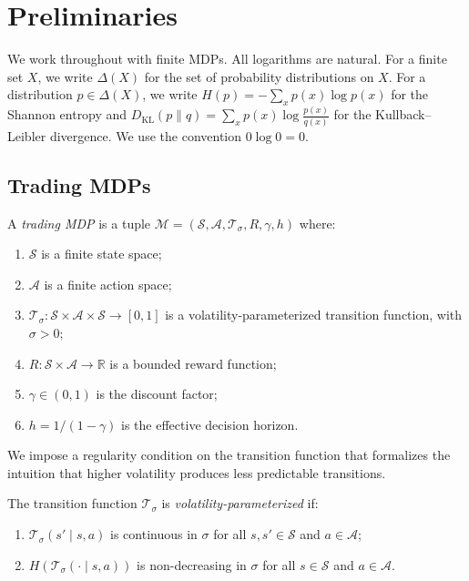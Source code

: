 \section{Preliminaries}\label{sec:prelim}

We work throughout with finite MDPs. All logarithms are natural. For a
finite set $X$, we write $\Delta(X)$ for the set of probability
distributions on $X$. For a distribution $p \in \Delta(X)$, we write
$H(p) = -\sum_{x} p(x) \log p(x)$ for the Shannon entropy and
$D_{\mathrm{KL}}(p \| q) = \sum_x p(x) \log \frac{p(x)}{q(x)}$ for the
Kullback--Leibler divergence. We use the convention $0 \log 0 = 0$.

\subsection{Trading MDPs}

\begin{definition}\label{def:trading-mdp}
A \emph{trading MDP} is a tuple $\mathcal{M} = (\mathcal{S}, \mathcal{A},
\mathcal{T}_\sigma, R, \gamma, h)$ where:
\begin{enumerate}[label=(\roman*)]
\item $\mathcal{S}$ is a finite state space;
\item $\mathcal{A}$ is a finite action space;
\item $\mathcal{T}_\sigma \colon \mathcal{S} \times \mathcal{A} \times
  \mathcal{S} \to [0,1]$ is a volatility-parameterized transition function,
  with $\sigma > 0$;
\item $R \colon \mathcal{S} \times \mathcal{A} \to \mathbb{R}$ is a bounded
  reward function;
\item $\gamma \in (0,1)$ is the discount factor;
\item $h = 1/(1-\gamma)$ is the effective decision horizon.
\end{enumerate}
\end{definition}

We impose a regularity condition on the transition function that formalizes
the intuition that higher volatility produces less predictable transitions.

\begin{definition}\label{def:vol-transitions}
The transition function $\mathcal{T}_\sigma$ is \emph{volatility-parameterized}
if:
\begin{enumerate}[label=(\roman*)]
\item $\mathcal{T}_\sigma(s' \mid s, a)$ is continuous in $\sigma$ for all
  $s, s' \in \mathcal{S}$ and $a \in \mathcal{A}$;
\item $H(\mathcal{T}_\sigma(\cdot \mid s, a))$ is non-decreasing in $\sigma$
  for all $s \in \mathcal{S}$ and $a \in \mathcal{A}$.
\end{enumerate}
\end{definition}

